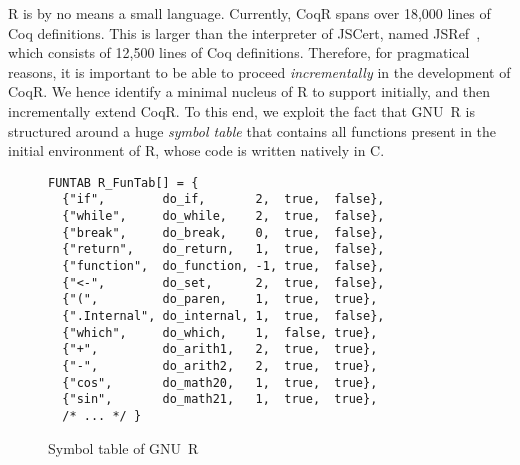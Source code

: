 \documentclass[
    sigplan,
    10pt,
    review, %
    natbib=false %
 ]{acmart}
\newcommand\mb[1]{\todo[color=purple!20,size=\scriptsize]{#1}}
\newcommand\mbi[1]{\todo[color=purple!20,inline]{#1}}
\newcommand\et[1]{\todo[color=blue!20,size=\scriptsize]{#1}}
\newcommand\CoqR{CoqR}
\begin{document}
R is by no means a small language.
Currently, \CoqR{} spans over 18,000 lines of Coq definitions.
This is larger than the interpreter of JSCert, named JSRef~\parencite{popl14jscert}, which consists of 12,500 lines of Coq definitions.
Therefore, for pragmatical reasons, it is important to be able to proceed {\em incrementally} in the development of \CoqR{}.
We hence identify a minimal nucleus of R to support initially, and then incrementally extend \CoqR{}.
To this end, we exploit the fact that GNU~R is structured around a huge {\em symbol table} that contains all functions present in the initial environment of R, whose code is written natively in C.

\begin{figure}
\begin{verbatim}
FUNTAB R_FunTab[] = {
  {"if",        do_if,       2,  true,  false},
  {"while",     do_while,    2,  true,  false},
  {"break",     do_break,    0,  true,  false},
  {"return",    do_return,   1,  true,  false},
  {"function",  do_function, -1, true,  false},
  {"<-",        do_set,      2,  true,  false},
  {"(",         do_paren,    1,  true,  true},
  {".Internal", do_internal, 1,  true,  false},
  {"which",     do_which,    1,  false, true},
  {"+",         do_arith1,   2,  true,  true},
  {"-",         do_arith2,   2,  true,  true},
  {"cos",       do_math20,   1,  true,  true},
  {"sin",       do_math21,   1,  true,  true},
  /* ... */ }
\end{verbatim}
\vspace{-1em}
    \caption{Symbol table of GNU~R}
    \label{fig:names}
\end{figure}
\end{document}

